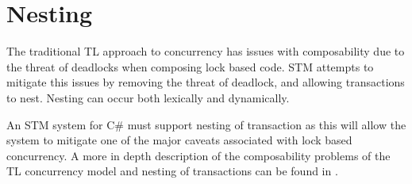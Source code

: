 \section{Nesting}
\label{sec:stm_req_nesting}
The traditional \ac{TL} approach to concurrency has issues with composability due to the threat of deadlocks\cite[p. 58]{sutter2005software} when composing lock based code. \ac{STM} attempts to mitigate this issues by removing the threat of deadlock, and allowing transactions to nest. Nesting can occur both lexically and dynamically\cite[p. 1]{kumar2011hparstm}\cite[p. 42]{harris2010transactional}\cite[p. 2081]{herlihy2011tm}. 

%
%
%       
%
%
%       

An \ac{STM} system for C\# must support nesting of transaction as this will allow the system to mitigate one of the major caveats associated with lock based concurrency. A more in depth description of the composability problems of the \ac{TL} concurrency model and nesting of transactions can be found in \cite{dpt907e14trending}.

